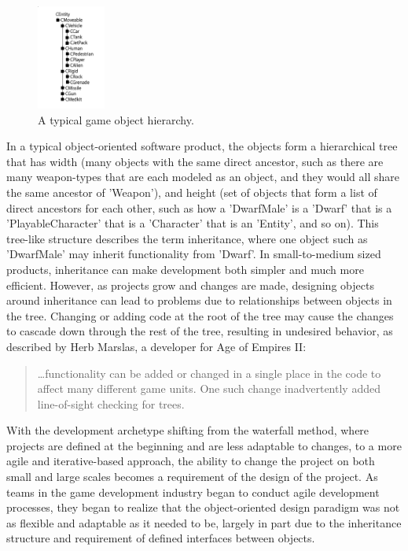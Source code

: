 \begin{figure}[!h]
  \centering \includegraphics[width=0.2\textwidth]{Images/tree}
  \caption{A typical game object hierarchy. \cite{west2006evolve}}
\end{figure}

In a typical object-oriented software product, the objects form a hierarchical tree that has width (many objects with the same direct ancestor, such as there are many weapon-types that are each modeled as an object, and they would all share the same ancestor of 'Weapon'), and height (set of objects that form a list of direct ancestors for each other, such as how a 'DwarfMale' is a 'Dwarf' that is a 'PlayableCharacter' that is a 'Character' that is an 'Entity', and so on). This tree-like structure describes the term inheritance, where one object such as 'DwarfMale' may inherit functionality from 'Dwarf'. In small-to-medium sized products, inheritance can make development both simpler and much more efficient. However, as projects grow and changes are made, designing objects around inheritance can lead to problems due to relationships between objects in the tree. Changing or adding code at the root of the tree may cause the changes to cascade down through the rest of the tree, resulting in undesired behavior, as described by Herb Marslas, a developer for Age of Empires II:

\begin{quote}
\ldots functionality can be added or changed in a single place in the code to affect many different game units. One such change inadvertently added line-of-sight checking for trees\cite{wilson2003game}.
\end{quote}

With the development archetype shifting from the waterfall method, where projects are defined at the beginning and are less adaptable to changes, to a more agile and iterative-based approach, the ability to change the project on both small and large scales becomes a requirement of the design of the project. As teams in the game development industry began to conduct agile development processes, they began to realize that the object-oriented design paradigm was not as flexible and adaptable as it needed to be, largely in part due to the inheritance structure and requirement of defined interfaces between objects.

